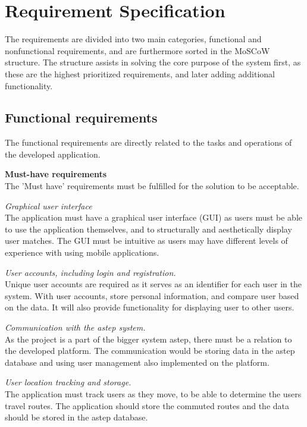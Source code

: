 \section{Requirement Specification}\label{sec:req}
The requirements are divided into two main categories, functional and nonfunctional requirements, and are furthermore sorted in the MoSCoW \cite{moscow} structure.
The structure assists in solving the core purpose of the system first, as these are the highest prioritized requirements, and later adding additional functionality.


\subsection{Functional requirements}
The functional requirements are directly related to the tasks and operations of the developed application.

\textbf{Must-have requirements}\\
The 'Must have' requirements must be fulfilled for the solution to be acceptable.

\textit{Graphical user interface}\\
The application must have a graphical user interface (GUI) as users must be able to use the application themselves, and to structurally and aesthetically display user matches. 
The GUI must be intuitive as users may have different levels of experience with using mobile applications.

\textit{User accounts, including login and registration.}\\
Unique user accounts are required as it serves as an identifier for each user in the system. 
With user accounts, store personal information, and compare user based on the data. 
It will also provide functionality for displaying user to other users.

\textit{Communication with the \gls{astep} system.}\\
As the project is a part of the bigger system \gls{astep}, there must be a relation to the developed platform. 
The communication would be storing data in the \gls{astep} database and using user management also implemented on the platform.

\textit{User location tracking and storage.}\\
The application must track users as they move, to be able to determine the users travel routes.
The application should store the commuted routes and the data should be stored in the \gls{astep} database.

